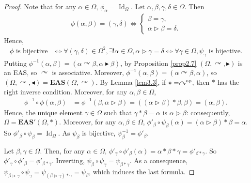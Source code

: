 \documentclass[pdftex]{sigma}
\numberwithin{equation}{section}
\newcommand{\eas}{\mathbf{EAS}}
\begin{document}
\begin{proof}
Note that for any $\alpha \in \Omega$, $\phi_\alpha=\operatorname{Id}_\Omega$. Let $\alpha,\beta,\gamma,\delta\in \Omega$. Then
\begin{align*}
\phi(\alpha,\beta)=(\gamma,\delta) \Longleftrightarrow \begin{cases}
\beta=\gamma,\\
\alpha\triangleright \beta=\delta.
\end{cases}\end{align*}
Hence,
\begin{align*}
\phi\text{ is bijective}&\Longleftrightarrow\forall (\gamma,\delta)\in \Omega^2, \exists! \alpha \in \Omega, \alpha \triangleright\gamma=\delta\Longleftrightarrow\forall\gamma \in \Omega, \psi_\gamma\text{ is bijective}.
\end{align*}
Putting $\phi^{-1}(\alpha,\beta)=(\alpha\curvearrowright \beta,\alpha \blacktriangleright \beta)$, by Proposition \ref{prop2.7} $(\Omega,\curvearrowright,\blacktriangleright)$ is an EAS, so $\curvearrowright$ is associative.
Moreover, $\phi^{-1}(\alpha,\beta)=(\alpha \curvearrowright \beta,\alpha)$, so $(\Omega,\curvearrowright,\blacktriangleleft)=\eas(\Omega,\curvearrowright)$.
By Lemma \ref{lem3.3}, if $*=\curvearrowright^{\rm op}$, then $*$ has the right inverse condition. Moreover, for any $\alpha,\beta \in \Omega$,
\begin{align*}
\phi^{-1}\circ \phi(\alpha,\beta)&=\phi^{-1}(\beta,\alpha \triangleright \beta)=((\alpha \triangleright \beta)*\beta,\beta)=(\alpha,\beta).
\end{align*}
Hence, the unique element $\gamma \in \Omega$ such that $\gamma*\beta=\alpha$ is $\alpha \triangleright \beta$: consequently, $\Omega=\eas'(\Omega,*)$. Moreover, for any $\alpha,\beta \in \Omega$,
$\phi'_\beta \circ \psi_\beta(\alpha)=(\alpha\triangleright \beta) *\beta=\alpha$.
So $\phi'_\beta\circ \psi_\beta=\operatorname{Id}_\Omega$. As $\psi_\beta$ is bijective, $\psi_\beta^{-1}=\phi'_\beta$.

Let $\beta,\gamma\in \Omega$. Then, for any $\alpha \in \Omega$,
$\phi'_\gamma \circ \phi'_\beta(\alpha)=\alpha *\beta*\gamma=\phi'_{\beta*\gamma}$.
So $\phi'_\gamma\circ \phi'_\beta=\phi'_{\beta*\gamma}$. Inverting, $\psi_\beta\circ \psi_\gamma=\psi_{\beta*\gamma}$. As a consequence,
$\psi_{\beta \triangleright \gamma}\circ \psi_\gamma=\psi_{(\beta \triangleright \gamma)*\gamma}=\psi_\beta$,
which induces the last formula. \end{proof}
\end{document}
